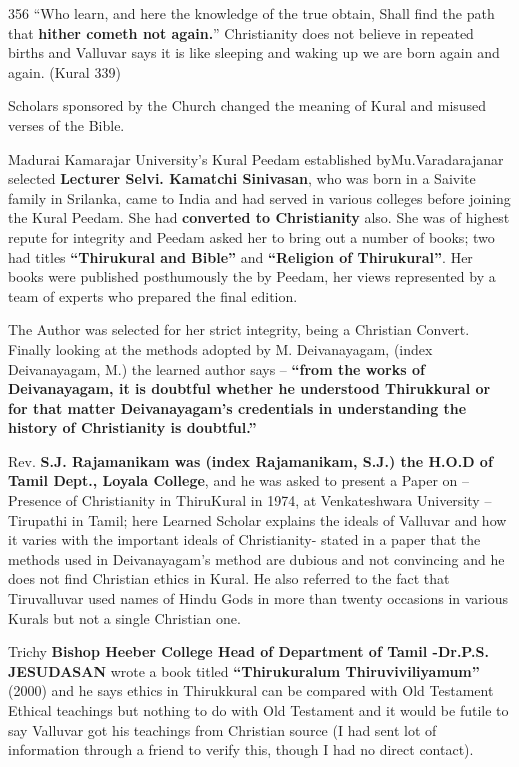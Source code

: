 356  “Who learn, and here the knowledge of the true obtain, Shall find the path that \textbf{hither cometh not again.}” Christianity does not believe in repeated births and Valluvar says it is like sleeping and waking up we are born again and again. (Kural 339)

Scholars sponsored by the Church changed the meaning of Kural and misused verses of the Bible.

Madurai Kamarajar University’s Kural Peedam established by\break Mu.Varadarajanar selected \textbf{Lecturer Selvi. Kamatchi Sinivasan}, who was born in a Saivite family in Srilanka, came to India and had served in various colleges before joining the Kural Peedam. She had \textbf{converted to Christianity} also. She was of highest repute for integrity and Peedam asked her to bring out a number of books; two had titles \textbf{“Thirukural and Bible”} and \textbf{“Religion of Thirukural”}. Her books were published posthumously the by Peedam, her views represented by a team of experts who prepared the final edition.

The Author was selected for her strict integrity, being a Christian Convert. Finally looking at the methods adopted by M. Deivanayagam, (index Deivanayagam, M.) the learned author says\endnote{} – \textbf{“from the works of Deivanayagam, it is doubtful whether he understood Thirukkural or for that matter Deivanayagam’s credentials in understanding the history of Christianity is doubtful.”}

Rev. \textbf{S.J. Rajamanikam was (index Rajamanikam, S.J.) the H.O.D of Tamil Dept., Loyala College}\endnote{}, and he was asked to present a Paper on – Presence of Christianity in ThiruKural in 1974, at Venkateshwara University – Tirupathi in Tamil; here Learned Scholar explains the ideals of Valluvar and how it varies with the important ideals of Christianity- stated in a paper that the methods used in Deivanayagam’s method are dubious and not convincing and he does not find Christian ethics in Kural. He also referred to the fact that Tiruvalluvar used names of Hindu Gods in more than twenty occasions in various Kurals but not a single Christian one.

Trichy \textbf{Bishop Heeber College Head of Department of Tamil -\break Dr.P.S. JESUDASAN} wrote a book titled \textbf{“Thirukuralum Thiruvi\-viliyamum”}\endnote{} (2000) and he says ethics in Thirukkural can be compared with Old Testament Ethical teachings but nothing to do with Old Testament and it would be futile to say Valluvar got his teachings from Christian source (I had sent lot of information through a friend to verify this, though I had no direct contact).

